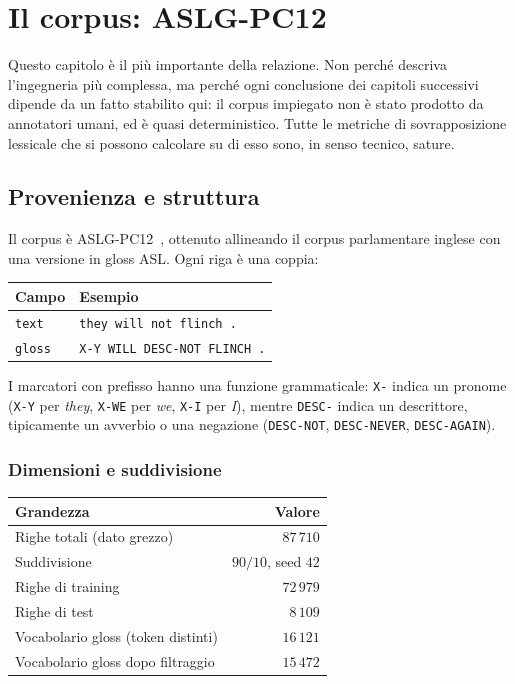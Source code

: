 \chapter{Il corpus: ASLG-PC12}
\label{cap:dataset}

Questo capitolo è il più importante della relazione. Non perché descriva
l'ingegneria più complessa, ma perché ogni conclusione dei capitoli successivi
dipende da un fatto stabilito qui: il corpus impiegato non è stato prodotto da
annotatori umani, ed è quasi deterministico. Tutte le metriche di
sovrapposizione lessicale che si possono calcolare su di esso sono, in senso
tecnico, sature.

\section{Provenienza e struttura}

Il corpus è ASLG-PC12~\cite{othman2012aslgpc12}, ottenuto allineando il corpus
parlamentare inglese con una versione in gloss ASL. Ogni riga è una coppia:

\begin{center}
\begin{tabular}{ll}
\toprule
Campo & Esempio \\
\midrule
\texttt{text}  & \texttt{they will not flinch .} \\
\texttt{gloss} & \texttt{X-Y WILL DESC-NOT FLINCH .} \\
\bottomrule
\end{tabular}
\end{center}

I marcatori con prefisso hanno una funzione grammaticale:
\texttt{X-} indica un pronome (\texttt{X-Y} per \emph{they}, \texttt{X-WE} per
\emph{we}, \texttt{X-I} per \emph{I}), mentre \texttt{DESC-} indica un
descrittore, tipicamente un avverbio o una negazione (\texttt{DESC-NOT},
\texttt{DESC-NEVER}, \texttt{DESC-AGAIN}).

\subsection{Dimensioni e suddivisione}

\begin{center}
\begin{tabular}{lr}
\toprule
Grandezza & Valore \\
\midrule
Righe totali (dato grezzo) & $87\,710$ \\
Suddivisione & $90/10$, seed $42$ \\
Righe di training & $72\,979$ \\
Righe di test & $8\,109$ \\
Vocabolario gloss (token distinti) & $16\,121$ \\
Vocabolario gloss dopo filtraggio & $15\,472$ \\
\bottomrule
\end{tabular}
\end{center}

